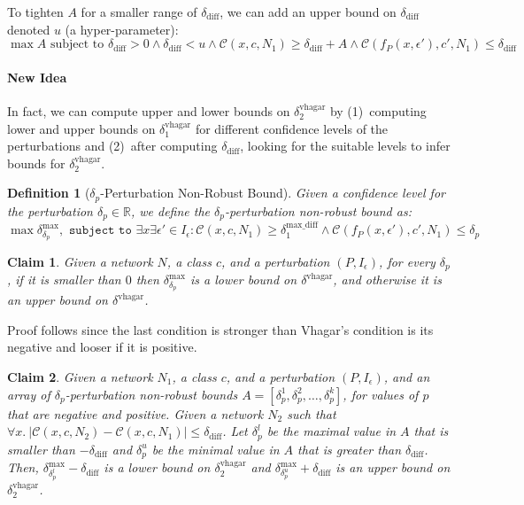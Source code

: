 \documentclass[11pt]{article}
\newtheorem{definition}{Definition}
\newtheorem{claim}{Claim}
\begin{document}
  To tighten $A$ for a smaller range of $\delta_\text{diff}$, we can add an upper bound on $\delta_\text{diff}$ denoted $u$ (a hyper-parameter):
  \begin{equation}\label{eq:ourproof}
 \max A \text{ subject to } \delta_\text{diff}>0\land \delta_\text{diff}<u\land \mathcal{C}(x,c,N_1) \geq \delta_\text{diff} + A\land \mathcal{C}(f_P(x,\epsilon'),c',N_1)\leq \delta_\text{diff}
 \end{equation}
 \paragraph{New Idea}
 In fact, we can compute upper and lower bounds on $\delta^\text{vhagar}_2$ by (1)~computing lower and upper bounds on  $\delta^\text{vhagar}_1$ for different confidence levels of the perturbations and (2)~after computing $\delta_\text{diff}$, looking for the suitable levels to infer bounds for $\delta^\text{vhagar}_2$.
 \begin{definition}[$\delta_p$-Perturbation Non-Robust Bound]
 Given a confidence level for the perturbation $\delta_p\in\mathbb{R}$, we define the $\delta_p$-perturbation non-robust bound as:  
\begin{equation}\label{eq:vagbound}
\max{\delta^\text{max}_{\delta_p}}, \texttt{ subject to } \exists{x}\exists{\epsilon'}\in{I_\epsilon}: \mathcal{C}(x,c,N_1) \geq \delta^\text{max\_diff}_1 \land \mathcal{C}(f_P(x,\epsilon'),c',N_1)\leq \delta_p
\end{equation}
\end{definition}
\begin{claim}\label{claim:n1}
Given a network $N$, a class $c$, and a perturbation $(P,I_\epsilon)$,
  for every $\delta_p$, if it is smaller than $0$ then ${\delta^\text{max}_{\delta_p}}$ is a lower bound on $\delta^\text{vhagar}$, and otherwise it is an upper bound on  $\delta^\text{vhagar}$. 
\end{claim}
Proof follows since the last condition is stronger than Vhagar's condition is its negative and looser if it is positive.
 \begin{claim}\label{claim:n2}
 Given a network $N_1$, a class $c$, and a perturbation $(P,I_\epsilon)$,
 and an array of $\delta_p$-perturbation non-robust bounds $A=[\delta^1_p,\delta^2_p,\ldots,\delta_p^k]$, for values of $p$ that are negative and positive. Given a network $N_2$ such that  $\forall x.\ |\mathcal{C}(x,c,N_2)-\mathcal{C}(x,c,N_1)|\leq \delta_\text{diff}$. Let $\delta^l_p$ be the maximal value in $A$ that is smaller than $-\delta_\text{diff}$ and $\delta^u_p$ be the minimal value in $A$ that is greater than $\delta_\text{diff}$. Then, ${\delta^\text{max}_{\delta^l_p}}-\delta_\text{diff}$ is a lower bound on  $\delta^\text{vhagar}_2$ and 
 ${\delta^\text{max}_{\delta^u_p}}+\delta_\text{diff}$ is an upper bound on  $\delta^\text{vhagar}_2$.
 \end{claim}
\end{document}
